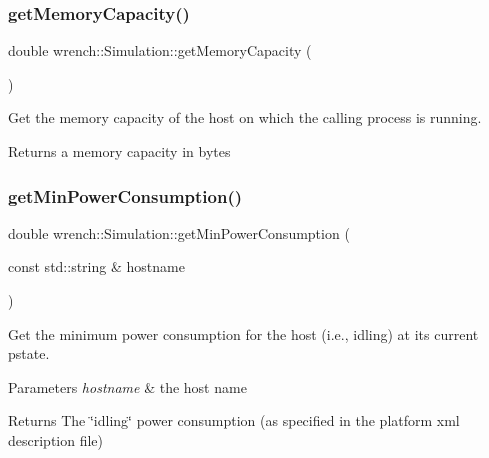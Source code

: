 \subsubsection{\texorpdfstring{get\+Memory\+Capacity()}{getMemoryCapacity()}}
{\footnotesize\ttfamily double wrench\+::\+Simulation\+::get\+Memory\+Capacity (\begin{DoxyParamCaption}{ }\end{DoxyParamCaption})\hspace{0.3cm}{\ttfamily [static]}}



Get the memory capacity of the host on which the calling process is running. 

\begin{DoxyReturn}{Returns}
a memory capacity in bytes 
\end{DoxyReturn}
\mbox{\label{classwrench_1_1_simulation_afdf2ae84f6b3c8b51c5189199bebb52e}} 
\subsubsection{\texorpdfstring{get\+Min\+Power\+Consumption()}{getMinPowerConsumption()}}
{\footnotesize\ttfamily double wrench\+::\+Simulation\+::get\+Min\+Power\+Consumption (\begin{DoxyParamCaption}\item[{const std\+::string \&}]{hostname }\end{DoxyParamCaption})\hspace{0.3cm}{\ttfamily [static]}}



Get the minimum power consumption for the host (i.\+e., idling) at its current pstate. 


\begin{DoxyParams}{Parameters}
{\em hostname} & the host name \\
\hline
\end{DoxyParams}
\begin{DoxyReturn}{Returns}
The \char`\"{}idling\char`\"{} power consumption (as specified in the platform xml description file) 
\end{DoxyReturn}
\mbox{\label{classwrench_1_1_simulation_a5e8d5b963d2278c79b49a0ed7db2b933}} 
